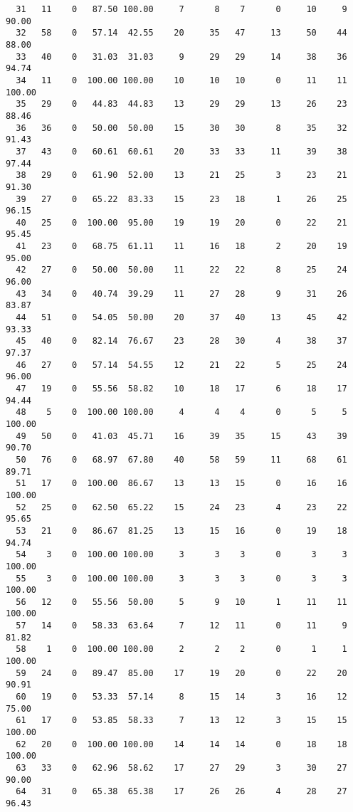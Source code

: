 \begin{verbatim}
  31   11    0   87.50 100.00     7      8    7      0     10     9    90.00
  32   58    0   57.14  42.55    20     35   47     13     50    44    88.00
  33   40    0   31.03  31.03     9     29   29     14     38    36    94.74
  34   11    0  100.00 100.00    10     10   10      0     11    11   100.00
  35   29    0   44.83  44.83    13     29   29     13     26    23    88.46
  36   36    0   50.00  50.00    15     30   30      8     35    32    91.43
  37   43    0   60.61  60.61    20     33   33     11     39    38    97.44
  38   29    0   61.90  52.00    13     21   25      3     23    21    91.30
  39   27    0   65.22  83.33    15     23   18      1     26    25    96.15
  40   25    0  100.00  95.00    19     19   20      0     22    21    95.45
  41   23    0   68.75  61.11    11     16   18      2     20    19    95.00
  42   27    0   50.00  50.00    11     22   22      8     25    24    96.00
  43   34    0   40.74  39.29    11     27   28      9     31    26    83.87
  44   51    0   54.05  50.00    20     37   40     13     45    42    93.33
  45   40    0   82.14  76.67    23     28   30      4     38    37    97.37
  46   27    0   57.14  54.55    12     21   22      5     25    24    96.00
  47   19    0   55.56  58.82    10     18   17      6     18    17    94.44
  48    5    0  100.00 100.00     4      4    4      0      5     5   100.00
  49   50    0   41.03  45.71    16     39   35     15     43    39    90.70
  50   76    0   68.97  67.80    40     58   59     11     68    61    89.71
  51   17    0  100.00  86.67    13     13   15      0     16    16   100.00
  52   25    0   62.50  65.22    15     24   23      4     23    22    95.65
  53   21    0   86.67  81.25    13     15   16      0     19    18    94.74
  54    3    0  100.00 100.00     3      3    3      0      3     3   100.00
  55    3    0  100.00 100.00     3      3    3      0      3     3   100.00
  56   12    0   55.56  50.00     5      9   10      1     11    11   100.00
  57   14    0   58.33  63.64     7     12   11      0     11     9    81.82
  58    1    0  100.00 100.00     2      2    2      0      1     1   100.00
  59   24    0   89.47  85.00    17     19   20      0     22    20    90.91
  60   19    0   53.33  57.14     8     15   14      3     16    12    75.00
  61   17    0   53.85  58.33     7     13   12      3     15    15   100.00
  62   20    0  100.00 100.00    14     14   14      0     18    18   100.00
  63   33    0   62.96  58.62    17     27   29      3     30    27    90.00
  64   31    0   65.38  65.38    17     26   26      4     28    27    96.43

\end{verbatim}
